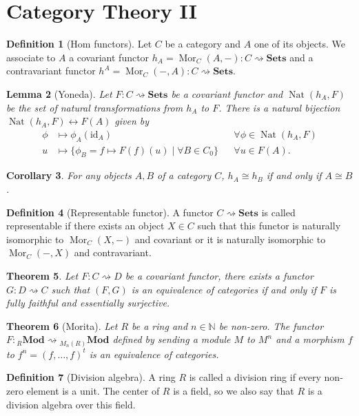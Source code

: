 \documentclass[paper=a4, fontsize=12pt]{scrartcl} %
\newtheorem{thm}{Theorem}
\newtheorem{cor}[thm]{Corollary}
\newtheorem{lem}[thm]{Lemma}
\theoremstyle{definition}
\newtheorem{defn}[thm]{Definition}
\theoremstyle{remark}
\newcommand{\N}{\mathbb{N}}
\DeclareMathOperator{\Mor}{Mor}
\DeclareMathOperator{\Nat}{Nat}
\begin{document}
\section{Category Theory II}
\begin{defn}[Hom functors]
	Let $C$ be a category and $A$ one of its objects. We associate to $A$ a covariant functor $h_A = \Mor_C(A,-) : C \rightsquigarrow \textbf{Sets}$ and a contravariant functor $h^A = \Mor_C(-,A): C\rightsquigarrow \textbf{Sets}$.
\end{defn}
\begin{lem}[Yoneda]
	Let $F: C\rightsquigarrow \textbf{Sets}$ be a covariant functor and $\Nat(h_A, F)$ be the set of natural transformations from $h_A$ to $F$. There is a natural bijection $\Nat(h_A, F) \leftrightarrow F(A)$ given by 
	\begin{align*}
		\phi &\mapsto \phi_A(\text{id}_A) &&\forall \phi \in \Nat(h_A, F)\\
		u &\mapsto \{\phi_B = f \mapsto F(f)(u) \mid \forall B \in C_0\} && \forall u \in F(A).
	\end{align*}
\end{lem}
\begin{cor}
	For any objects $A, B$ of a category $C$, $h_A \cong h_B$ if and only if $A \cong B$.
\end{cor}
\begin{defn}[Representable functor]
	A functor $C\rightsquigarrow \textbf{Sets}$ is called representable if there exists an object $X\in C$ such that this functor is naturally isomorphic to $\Mor_C(X,-)$ and covariant or it is naturally isomorphic to $\Mor_C(-,X)$ and contravariant.
\end{defn}
\begin{thm}
	Let $F: C\rightsquigarrow D$ be a covariant functor, there exists a functor $G:D\rightsquigarrow C$ such that $(F,G)$ is an equivalence of categories if and only if $F$ is fully faithful and essentially surjective.
\end{thm}
\begin{thm}[Morita]
	Let $R$ be a ring and $n \in \N$ be non-zero. The functor $F: {}_R\textbf{Mod} \rightsquigarrow {}_{M_n(R)}\textbf{Mod}$ defined by sending a module $M$ to $M^n$ and a morphism $f$ to $f^n = (f, \dots, f)^t$ is an equivalence of categories.
\end{thm}
\begin{defn}[Division algebra]
	A ring $R$ is called a division ring if every non-zero element is a unit. The center of $R$ is a field, so we also say that $R$ is a division algebra over this field. 
\end{defn}
\end{document}
